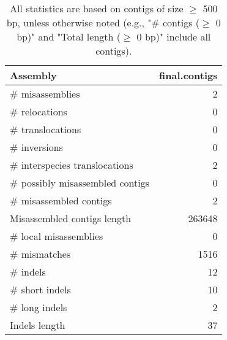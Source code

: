 \documentclass[12pt,a4paper]{article}
\begin{document}
\begin{table}[ht]
\begin{center}
\caption{All statistics are based on contigs of size $\geq$ 500 bp, unless otherwise noted (e.g., "\# contigs ($\geq$ 0 bp)" and "Total length ($\geq$ 0 bp)" include all contigs).}
\begin{tabular}{|l*{1}{|r}|}
\hline
Assembly & final.contigs \\ \hline
\# misassemblies & 2 \\ \hline
\hspace{5mm}\# relocations & 0 \\ \hline
\hspace{5mm}\# translocations & 0 \\ \hline
\hspace{5mm}\# inversions & 0 \\ \hline
\hspace{5mm}\# interspecies translocations & 2 \\ \hline
\# possibly misassembled contigs & 0 \\ \hline
\# misassembled contigs & 2 \\ \hline
Misassembled contigs length & 263648 \\ \hline
\# local misassemblies & 0 \\ \hline
\# mismatches & 1516 \\ \hline
\# indels & 12 \\ \hline
\hspace{5mm}\# short indels & 10 \\ \hline
\hspace{5mm}\# long indels & 2 \\ \hline
Indels length & 37 \\ \hline
\end{tabular}
\end{center}
\end{table}
\end{document}
